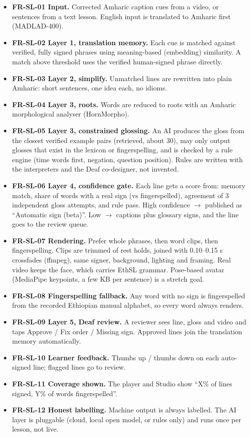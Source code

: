 \documentclass[11pt,a4paper]{article}
\newcommand{\req}[1]{\textbf{#1}}
\begin{document}
\begin{itemize}
  \item \req{FR-SL-01 Input.} Corrected Amharic caption cues from a video, or sentences from a text lesson. English input is translated to Amharic first (MADLAD-400).
  \item \req{FR-SL-02 Layer 1, translation memory.} Each cue is matched against verified, fully signed phrases using meaning-based (embedding) similarity. A match above threshold uses the verified human-signed phrase directly.
  \item \req{FR-SL-03 Layer 2, simplify.} Unmatched lines are rewritten into plain Amharic: short sentences, one idea each, no idioms.
  \item \req{FR-SL-04 Layer 3, roots.} Words are reduced to roots with an Amharic morphological analyser (HornMorpho).
  \item \req{FR-SL-05 Layer 3, constrained glossing.} An AI produces the gloss from the closest verified example pairs (retrieved, about 30), may only output glosses that exist in the lexicon or fingerspelling, and is checked by a rule engine (time words first, negation, question position). Rules are written with the interpreters and the Deaf co-designer, not invented.
  \item \req{FR-SL-06 Layer 4, confidence gate.} Each line gets a score from: memory match, share of words with a real sign (vs fingerspelled), agreement of 3 independent gloss attempts, and rule pass. High confidence $\rightarrow$ published as ``Automatic sign (beta)''. Low $\rightarrow$ captions plus glossary signs, and the line goes to the review queue.
  \item \req{FR-SL-07 Rendering.} Prefer whole phrases, then word clips, then fingerspelling. Clips are trimmed of rest holds, joined with 0.10--0.15 s crossfades (ffmpeg), same signer, background, lighting and framing. Real video keeps the face, which carries EthSL grammar. Pose-based avatar (MediaPipe keypoints, a few KB per sentence) is a stretch goal.
  \item \req{FR-SL-08 Fingerspelling fallback.} Any word with no sign is fingerspelled from the recorded Ethiopian manual alphabet, so every word always renders.
  \item \req{FR-SL-09 Layer 5, Deaf review.} A reviewer sees line, gloss and video and taps Approve / Fix order / Missing sign. Approved lines join the translation memory automatically.
  \item \req{FR-SL-10 Learner feedback.} Thumbs up / thumbs down on each auto-signed line; flagged lines go to review.
  \item \req{FR-SL-11 Coverage shown.} The player and Studio show ``X\% of lines signed, Y\% of words fingerspelled''.
  \item \req{FR-SL-12 Honest labelling.} Machine output is always labelled. The AI layer is pluggable (cloud, local open model, or rules only) and runs once per lesson, not live.
\end{itemize}
\end{document}

